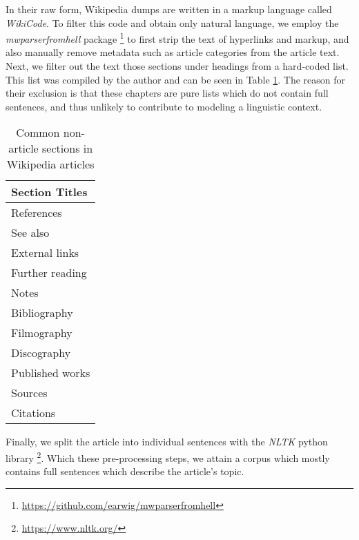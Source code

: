 In their raw form, Wikipedia dumps are written in a markup language called \textit{WikiCode}.
To filter this code and obtain only natural language, we employ the \textit{mwparserfromhell} package \footnote{\url{https://github.com/earwig/mwparserfromhell}} to first strip the text of hyperlinks and markup, and also manually remove metadata such as article categories from the article text.
Next, we filter out the text those sections under headings from a hard-coded list.
This list was compiled by the author and can be seen in Table \ref{tbl:wikipedia-ignored-headings}.
The reason for their exclusion is that these chapters are pure lists which do not contain full sentences, and thus unlikely to contribute to modeling a linguistic context.

\begin{table}[H]
	\centering
	\begin{tabular}{|l|}
		\hline
		\textbf{Section Titles} \\
		\hline
		References              \\
		See also                \\
		External links          \\
		Further reading         \\
		Notes                   \\
		Bibliography            \\
		Filmography             \\
		Discography             \\
		Published works         \\
		Sources                 \\
		Citations               \\
		\hline
	\end{tabular}
	\caption{Common non-article sections in Wikipedia articles}
	\label{tbl:wikipedia-ignored-headings}
\end{table}

Finally, we split the article into individual sentences with the \textit{NLTK} python library \footnote{\url{https://www.nltk.org/}}.
Which these pre-processing steps, we attain a corpus which mostly contains full	sentences which describe the article's topic.

